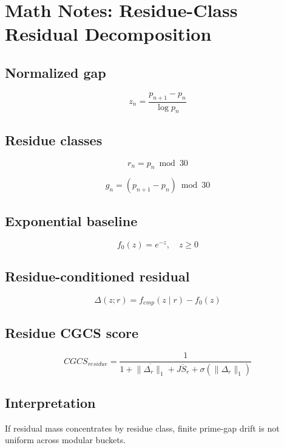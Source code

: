 \documentclass{article}
\begin{document}
\section*{Math Notes: Residue-Class Residual Decomposition}

\subsection*{Normalized gap}

\[
z_n = \frac{p_{n+1}-p_n}{\log p_n}
\]

\subsection*{Residue classes}

\[
r_n = p_n \bmod 30
\]

\[
g_n = (p_{n+1}-p_n) \bmod 30
\]

\subsection*{Exponential baseline}

\[
f_0(z)=e^{-z}, \quad z\ge 0
\]

\subsection*{Residue-conditioned residual}

\[
\Delta(z;r)=f_{emp}(z\mid r)-f_0(z)
\]

\subsection*{Residue CGCS score}

\[
CGCS_{residue} =
\frac{1}{1+\overline{\|\Delta_r\|_1}+\overline{JS_r}+\sigma(\|\Delta_r\|_1)}
\]

\subsection*{Interpretation}

If residual mass concentrates by residue class, finite prime-gap drift is not uniform across modular buckets.
\end{document}
